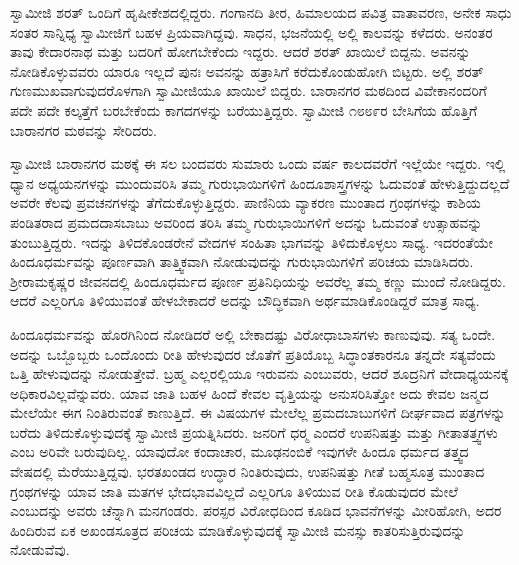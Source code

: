  ಸ್ವಾಮೀಜಿ ಶರತ್ ಒಂದಿಗೆ ಹೃಷೀಕೇಶದಲ್ಲಿದ್ದರು. ಗಂಗಾನದಿ ತೀರ, ಹಿಮಾಲಯದ ಪವಿತ್ರ ವಾತಾವರಣ, ಅನೇಕ ಸಾಧು ಸಂತರ ಸಾನ್ನಿಧ್ಯ ಸ್ವಾಮೀಜಿಗೆ ಬಹಳ ಪ್ರಿಯವಾಗಿದ್ದವು. ಸಾಧನ, ಭಜನೆಯಲ್ಲಿ ಅಲ್ಲಿ ಕಾಲವನ್ನು ಕಳೆದರು. ಅನಂತರ ತಾವು ಕೇದಾರನಾಥ ಮತ್ತು ಬದರಿಗೆ ಹೋಗಬೇಕೆಂದು ಇದ್ದರು. ಆದರೆ ಶರತ್ ಖಾಯಿಲೆ ಬಿದ್ದನು. ಅವನನ್ನು ನೋಡಿಕೊಳ್ಳುವವರು ಯಾರೂ ಇಲ್ಲದೆ ಪುನಃ ಅವನನ್ನು ಹತ್ರಾಸಿಗೆ ಕರೆದುಕೊಂಡುಹೋಗಿ ಬಿಟ್ಟರು. ಅಲ್ಲಿ ಶರತ್ ಗುಣಮುಖವಾಗುವುದರೊಳಗಾಗಿ ಸ್ವಾಮೀಜಿಯೂ ಖಾಯಿಲೆ ಬಿದ್ದರು. ಬಾರಾನಗರ ಮಠದಿಂದ ವಿವೇಕಾನಂದರಿಗೆ ಪದೇ ಪದೇ ಕಲ್ಕತ್ತೆಗೆ ಬರಬೇಕೆಂದು ಕಾಗದಗಳನ್ನು ಬರೆಯುತ್ತಿದ್ದರು. ಸ್ವಾಮೀಜಿ ೧೮೮೯ರ ಬೇಸಿಗೆಯ ಹೊತ್ತಿಗೆ ಬಾರಾನಗರ ಮಠವನ್ನು ಸೇರಿದರು. 

 ಸ್ವಾಮೀಜಿ ಬಾರಾನಗರ ಮಠಕ್ಕೆ ಈ ಸಲ ಬಂದವರು ಸುಮಾರು ಒಂದು ವರ್ಷ ಕಾಲದವರೆಗೆ ಇಲ್ಲೆಯೇ ಇದ್ದರು. ಇಲ್ಲಿ ಧ್ಯಾನ ಅಧ್ಯಯನಗಳನ್ನು ಮುಂದುವರಿಸಿ ತಮ್ಮ ಗುರುಭಾಯಿಗಳಿಗೆ ಹಿಂದೂಶಾಸ್ತ್ರಗಳನ್ನು ಓದುವಂತೆ ಹೇಳುತ್ತಿದ್ದುದಲ್ಲದೆ ಅವರೇ ಕೆಲವು ಪ್ರವಚನಗಳನ್ನು ತೆಗೆದುಕೊಳ್ಳುತ್ತಿದ್ದರು. ಪಾಣಿನಿಯ ವ್ಯಾಕರಣ ಮುಂತಾದ ಗ್ರಂಥಗಳನ್ನು ಕಾಶಿಯ ಪಂಡಿತರಾದ ಪ್ರಮದದಾಸಬಾಬು ಅವರಿಂದ ತರಿಸಿ ತಮ್ಮ ಗುರುಭಾಯಿಗಳಿಗೆ ಅದನ್ನು ಓದುವಂತೆ ಉತ್ಸಾಹವನ್ನು ತುಂಬುತ್ತಿದ್ದರು. ಇದನ್ನು ತಿಳಿದಕೊಂಡರೇನೆ ವೇದಗಳ ಸಂಹಿತಾ ಭಾಗವನ್ನು ತಿಳಿದುಕೊಳ್ಳಲು ಸಾಧ್ಯ. ಇದರಂತೆಯೇ ಹಿಂದೂಧರ್ಮವನ್ನು ಪೂರ್ಣವಾಗಿ ತಾತ್ತ್ವಿಕವಾಗಿ ನೋಡುವುದನ್ನು ಗುರುಭಾಯಿಗಳಿಗೆ ಪರಿಚಯ ಮಾಡಿಸಿದರು. ಶ‍್ರೀರಾಮಕೃಷ್ಣರ ಜೀವನದಲ್ಲಿ ಹಿಂದೂಧರ್ಮದ ಪೂರ್ಣ ಪ್ರತಿನಿಧಿಯನ್ನು ಅವರೆಲ್ಲ ತಮ್ಮ ಕಣ್ಣು ಮುಂದೆ ನೋಡಿದ್ದರು. ಆದರೆ ಎಲ್ಲರಿಗೂ ತಿಳಿಯುವಂತೆ ಹೇಳಬೇಕಾದರೆ ಅದನ್ನು ಬೌದ್ಧಿಕವಾಗಿ ಅರ್ಥಮಾಡಿಕೊಂಡಿದ್ದರೆ ಮಾತ್ರ ಸಾಧ್ಯ. 

 ಹಿಂದೂಧರ್ಮವನ್ನು ಹೊರಗಿನಿಂದ ನೋಡಿದರೆ ಅಲ್ಲಿ ಬೇಕಾದಷ್ಟು ವಿರೋಧಾಬಾಸಗಳು ಕಾಣುವುವು. ಸತ್ಯ ಒಂದೇ. ಅದನ್ನು ಒಬ್ಬೊಬ್ಬರು ಒಂದೊಂದು ರೀತಿ ಹೇಳುವುದರ ಜೊತೆಗೆ ಪ್ರತಿಯೊಬ್ಬ ಸಿದ್ಧಾಂತಕಾರನೂ ತನ್ನದೇ ಸತ್ಯವೆಂದು ಒತ್ತಿ ಹೇಳುವುದನ್ನು ನೋಡುತ್ತೇವೆ. ಬ್ರಹ್ಮ ಎಲ್ಲರಲ್ಲಿಯೂ ಇರುವನು ಎಂಬುವರು, ಆದರೆ ಶೂದ್ರನಿಗೆ ವೇದಾಧ್ಯಯನಕ್ಕೆ ಅಧಿಕಾರವಿಲ್ಲವೆನ್ನುವರು. ಯಾವ ಜಾತಿ ಬಹಳ ಹಿಂದೆ ಕೇವಲ ವೃತ್ತಿಯನ್ನು ಅನುಸರಿಸಿತ್ತೋ ಅದು ಕೇವಲ ಜನ್ಮದ ಮೇಲೆಯೇ ಈಗ ನಿಂತಿರುವಂತೆ ಕಾಣುತ್ತಿದೆ. ಈ ವಿಷಯಗಳ ಮೇಲೆಲ್ಲ ಪ್ರಮದಬಾಬುಗಳಿಗೆ ದೀರ್ಘವಾದ ಪತ್ರಗಳನ್ನು ಬರೆದು ತಿಳಿದುಕೊಳ್ಳುವುದಕ್ಕೆ ಸ್ವಾಮೀಜಿ ಪ್ರಯತ್ನಿಸಿದರು. ಜನರಿಗೆ ಧರ‍್ಮ ಎಂದರೆ ಉಪನಿಷತ್ತು ಮತ್ತು ಗೀತಾತತ್ತ್ವಗಳು ಎಂಬ ಅರಿವೇ ಬರುವುದಿಲ್ಲ. ಯಾವುದೋ ಕಂದಾಚಾರ, ಮೂಢನಂಬಿಕೆ ಇವುಗಳೇ ಹಿಂದೂ ಧರ್ಮದ ತತ್ತ್ವದ ವೇಷದಲ್ಲಿ ಮೆರೆಯುತ್ತಿದ್ದವು. ಭರತಖಂಡದ ಉದ್ಧಾರ ನಿಂತಿರುವುದು, ಉಪನಿಷತ್ತು ಗೀತೆ ಬಹ್ಮಸೂತ್ರ ಮುಂತಾದ ಗ್ರಂಥಗಳನ್ನು ಯಾವ ಜಾತಿ ಮತಗಳ ಭೇದಭಾವವಿಲ್ಲದೆ ಎಲ್ಲರಿಗೂ ತಿಳಿಯುವ ರೀತಿ ಕೊಡುವುದರ ಮೇಲೆ ಎಂಬುದನ್ನು ಅವರು ಚೆನ್ನಾಗಿ ಮನಗಂಡರು. ಪರಸ್ಪರ ವಿರೋಧದಿಂದ ಕೂಡಿದ ಭಾವನೆಗಳನ್ನು ಮೀರಿಹೋಗಿ, ಅದರ ಹಿಂದಿರುವ ಏಕ ಅಖಂಡಸೂತ್ರದ ಪರಿಚಯ ಮಾಡಿಕೊಳ್ಳುವುದಕ್ಕೆ ಸ್ವಾಮೀಜಿ ಮನಸ್ಸು ಕಾತರಿಸುತ್ತಿರುವುದನ್ನು ನೋಡುವೆವು. 

